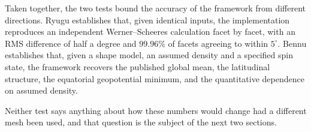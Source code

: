 Taken together, the two tests bound the accuracy of the framework from
different directions. Ryugu establishes that, given identical inputs, the
implementation reproduces an independent Werner--Scheeres calculation facet by
facet, with an RMS difference of half a degree and $99.96\%$ of facets
agreeing to within $5^{\circ}$. Bennu establishes that, given a shape model, an
assumed density and a specified spin state, the framework recovers the
published global mean, the
latitudinal structure, the equatorial geopotential minimum, and the
quantitative dependence on assumed density.

Neither test says anything about how these numbers would change had a different
mesh been used, and that question is the subject of the next two sections.
